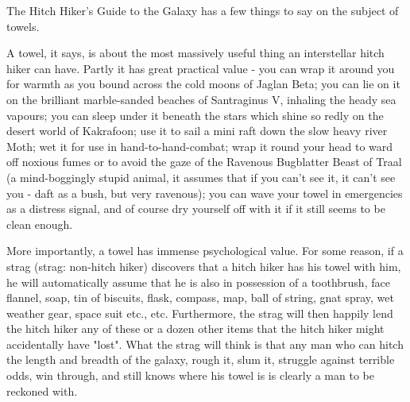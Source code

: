 \bigskip
\begin{linenumbers*}
\modulolinenumbers[5]
\indent The Hitch Hiker's Guide to the Galaxy has a few things to say on the subject of towels. 

\indent A towel, it says, is about the most massively useful thing an interstellar hitch hiker can have. Partly it has great practical value - you can wrap it around you for warmth as you bound across the cold moons of Jaglan Beta; you can lie on it on the brilliant marble-sanded beaches of Santraginus V, inhaling the heady sea vapours; you can sleep under it beneath the stars which shine so redly on the desert world of Kakrafoon; use it to sail a mini raft down the slow heavy river Moth; wet it for use in hand-to-hand-combat; wrap it round your head to ward off noxious fumes or to avoid the gaze of the Ravenous Bugblatter Beast of Traal (a mind-boggingly stupid animal, it assumes that if you can't see it, it can't see you - daft as a bush, but very ravenous); you can wave your towel in emergencies as a distress signal, and of course dry yourself off with it if it still seems to be clean enough.

\indent More importantly, a towel has immense psychological value. For some reason, if a strag (strag: non-hitch hiker) discovers that a hitch hiker has his towel with him, he will automatically assume that he is also in possession of a toothbrush, face flannel, soap, tin of biscuits, flask, compass, map, ball of string, gnat spray, wet weather gear, space suit etc., etc. Furthermore, the strag will then happily lend the hitch hiker any of these or a dozen other items that the hitch hiker might accidentally have "lost". What the strag will think is that any man who can hitch the length and breadth of the galaxy, rough it, slum it, struggle against terrible odds, win through, and still knows where his towel is is clearly a man to be reckoned with.
\end{linenumbers*}

